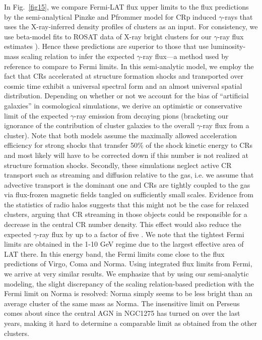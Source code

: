 \documentclass[10pt,aps,pra,reprint,amsmath,amsfonts,amssymb,showpacs]{revtex4-1}
\begin{document}
In Fig.~\ref{fig15}, we compare Fermi-LAT flux upper limits to the flux
predictions by the semi-analytical Pinzke and Pfrommer model
\cite{2010MNRAS.409..449P} for CRp induced $\gamma$-rays that uses the
X-ray-inferred density profiles of clusters as an input. For consistency, we use
beta-model fits to ROSAT data of X-ray bright clusters for our $\gamma$-ray flux
estimates \cite{2002ApJ...567..71}). Hence these predictions are superior to
those that use luminosity-mass scaling relation to infer the expected
$\gamma$-ray flux---a method used by reference \cite{2010ApJ...717L..71A} to
compare to Fermi limits.  In this semi-analytic model, we employ the fact that
CRs accelerated at structure formation shocks and transported over cosmic time
exhibit a universal spectral form and an almost universal spatial
distribution. Depending on whether or not we account for the bias of
``artificial galaxies'' in cosmological simulations, we derive an optimistic or
conservative limit of the expected $\gamma$-ray emission from decaying pions
(bracketing our ignorance of the contribution of cluster galaxies to the overall
$\gamma$-ray flux from a cluster). Note that both models assume the maximally
allowed acceleration efficiency for strong shocks that transfer 50\% of the
shock kinetic energy to CRs and most likely will have to be corrected down if
this number is not realized at structure formation shocks. Secondly, these
simulations neglect active CR transport such as streaming and diffusion relative
to the gas, i.e. we assume that advective transport is the dominant one and CRs
are tightly coupled to the gas via flux-frozen magnetic fields tangled on
sufficiently small scales. Evidence from the statistics of radio halos suggests
that this might not be the case for relaxed clusters, arguing that CR streaming
in those objects could be responsible for a decrease in the central CR number
density. This effect would also reduce the expected $\gamma$-ray flux by up to a
factor of five \cite{2011A&A...527A..99E}. We note that the tightest Fermi
limits are obtained in the 1-10 GeV regime due to the largest effective area of
LAT there. In this energy band, the Fermi limits come close to the flux
predictions of Virgo, Coma and Norma. Using integrated flux limits from Fermi,
we arrive at very similar results.  We emphasize that by using our semi-analytic
modeling, the slight discrepancy of the scaling relation-based prediction with
the Fermi limit on Norma \cite{2010ApJ...717L..71A} is resolved: Norma simply
seems to be less bright than an average cluster of the same mass as Norma. The
insensitive limit on Perseus comes about since the central AGN in NGC1275 has
turned on over the last years, making it hard to determine a comparable
limit as obtained from the other clusters.
\end{document}
